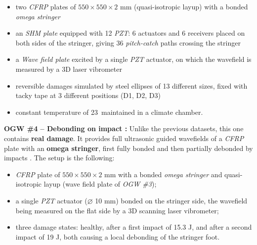 \documentclass[12pt]{article}
\begin{document}
\begin{itemize}[itemsep=4pt]

    \item two \textit{CFRP} plates of $550 \times 550 \times 2$ mm (quasi-isotropic layup) with a bonded \textit{omega stringer}
   
    \item an \textit{SHM plate} equipped with 12 \textit{PZT}: 6 actuators and 6 receivers placed on both sides of the stringer, giving 36 \textit{pitch-catch} paths crossing the stringer
    
    \item a \textit{Wave field plate} excited by a single \textit{PZT} actuator, on which the wavefield is measured by a 3D laser vibrometer
    
    \item reversible damages simulated by steel ellipses of 13 different sizes, fixed with tacky tape at 3 different positions (D1, D2, D3)
    
    \item constant temperature of 23\,\celsius{} maintained in a climate chamber.

\end{itemize}

\textbf{OGW \#4 -- Debonding on impact : } Unlike the previous datasets, this one contains \textbf{real damage}. It provides full ultrasonic guided wavefields of a \textit{CFRP} plate with an \textbf{omega stringer}, first fully bonded and then partially debonded by impacts \cite{kudela2022omega}. The setup is the following:

\begin{itemize}[itemsep=4pt]

    \item \textit{CFRP} plate of $550 \times 550 \times 2$ mm with a bonded \textit{omega stringer} and quasi-isotropic layup (wave field plate of \textit{OGW \#3});
    
    \item a single \textit{PZT} actuator ($\varnothing$ 10 mm) bonded on the stringer side, the wavefield being measured on the flat side by a 3D scanning laser vibrometer;
    
    \item three damage states: healthy, after a first impact of 15.3 J, and after a second impact of 19 J, both causing a local debonding of the stringer foot.

\end{itemize}
\end{document}
